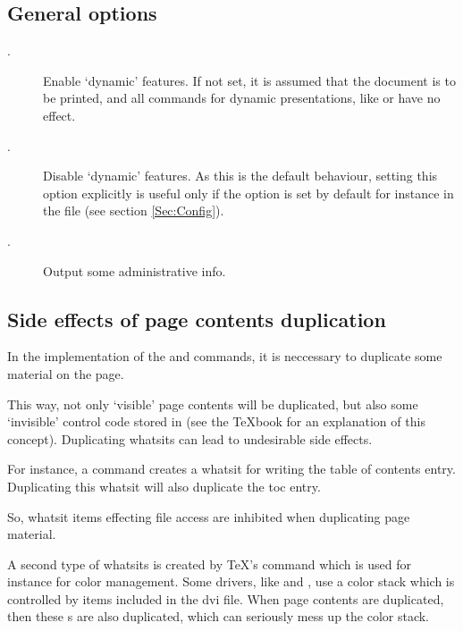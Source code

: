 \newslide
  
\subsection{General options}\label{Sec:GenOpt}
\begin{description}
\item[.] Enable `dynamic' features. If not set, it is assumed that the document is to be
  printed, and all commands for dynamic presentations, like  or  have no effect.

\item[.] Disable `dynamic' features. As this is the default behaviour,
  setting this option explicitly is useful only if the option  is set by default for instance in the
   file (see section \ref{Sec:Config}).

\item[.] Output some administrative info.
\end{description}

\subsection{Side effects of page contents duplication}\label{Sec:Dupl}
In the implementation of the  and  commands, it is neccessary to duplicate some
material on the page. 

This way, not only `visible' page contents will be duplicated, but also some `invisible' control code stored in
 (see the \TeX book for an explanation of this concept). Duplicating whatsits can lead to undesirable
side effects. 

For instance, a  command creates a whatsit for writing the table of contents entry. Duplicating this
whatsit will also duplicate the toc entry.

So, whatsit items effecting file access are inhibited when duplicating page material.

\newslide

A second type of whatsits is created by \TeX's  command which is used for instance for color
management. Some drivers, like  and , use a color stack which is controlled by
 items included in the dvi file. When page contents are duplicated, then these s
are also duplicated, which can seriously mess up the color stack.

